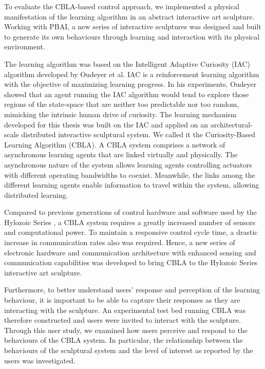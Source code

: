 To evaluate the CBLA-based control approach, we implemented a physical manifestation of the learning algorithm in an abstract interactive art sculpture. Working with PBAI, a new series of interactive sculptures was designed and built to generate its own behaviours through learning and interaction with its physical environment. 

The learning algorithm was based on the Intelligent Adaptive Curiosity \cite{Oudeyer2007} (IAC) algorithm developed by Oudeyer et al. IAC is a reinforcement learning algorithm with the objective of maximizing learning progress. In his experiments, Oudeyer showed that an agent running the IAC algorithm would tend to explore those regions of the state-space that are neither too predictable nor too random, mimicking the intrinsic human drive of curiosity. The learning mechanism developed for this thesis was built on the IAC and applied on an architectural-scale distributed interactive sculptural system. We called it the Curiosity-Based Learning Algorithm (CBLA). A CBLA system comprises a network of asynchronous learning agents that are linked virtually and physically. The asynchronous nature of the system allows learning agents controlling actuators with different operating bandwidths to coexist. Meanwhile, the links among the different learning agents enable information to travel within the system, allowing distributed learning.

Compared to previous generations of control hardware and software used by the Hylozoic Series \cite{Beesley2010-1}, a CBLA system requires a greatly increased number of sensors and computational power. To maintain a responsive control cycle time, a drastic increase in communication rates also was required. Hence, a new series of electronic hardware and communication architecture with enhanced sensing and communication capabilities was developed to bring CBLA to the Hylozoic Series interactive art sculpture. 

Furthermore, to better understand users' response and perception of the learning behaviour, it is important to be able to capture their responses as they are interacting with the sculpture. An experimental test bed running CBLA was therefore constructed and users were invited to interact with the sculpture. Through this user study, we examined how users perceive and respond to the behaviours of the CBLA system. In particular, the relationship between the behaviours of the sculptural system and the level of interest as reported by the users was investigated. 

